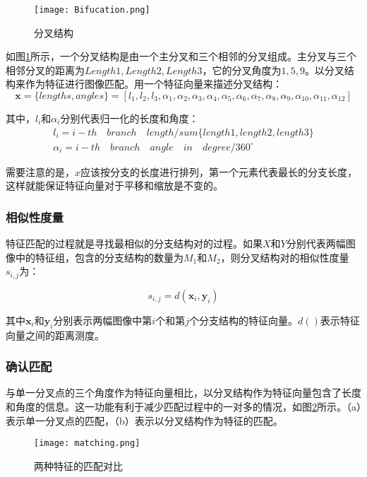 \documentclass[a4paper,12pt]{article}
\begin{document}
\begin{figure}[!htb] %
\centering
\texttt{[image: Bifucation.png]}
\caption{分叉结构}
\label{fig:1}
\end{figure}

如图\ref{fig:1}所示，一个分叉结构是由一个主分叉和三个相邻的分叉组成。主分叉与三个相邻分叉的距离为$Length1,Length2,Length3$，它的分叉角度为$1,5,9$。以分叉结构来作为特征进行图像匹配。用一个特征向量来描述分叉结构：
\begin{equation} 
\label{eq:3}
\boldsymbol{x}=\{lengths,angles\}=[l_1,l_2,l_3,\alpha_1,\alpha_2,\alpha_3,\alpha_4,\alpha_5,\alpha_6,\alpha_7,\alpha_8,\alpha_9,\alpha_{10},\alpha_{11},\alpha_{12}]
\end{equation}

其中，$l_i$和$\alpha_i$分别代表归一化的长度和角度：
\begin{equation} 
\label{eq:4}
\begin{array}{l}
l_i=i-th\quad branch\quad length/sum\{length 1,length 2,length 3\}\\
\alpha_i=i-th\quad branch\quad angle\quad in\quad degree/360^{\circ}
\end{array}
\end{equation}

需要注意的是，$x$应该按分支的长度进行排列，第一个元素代表最长的分支长度，这样就能保证特征向量对于平移和缩放是不变的。

\subsubsection{相似性度量}

特征匹配的过程就是寻找最相似的分支结构对的过程。如果$X$和$Y$分别代表两幅图像中的特征组，包含的分支结构的数量为$M_1$和$M_2$，则分叉结构对的相似性度量$s_{i,j}$为：

\begin{equation} 
\label{eq:5}
s_{i,j}=d(\boldsymbol{x}_i,\boldsymbol{y}_i)
\end{equation}

其中$\boldsymbol{x}_i$和$\boldsymbol{y}_i$分别表示两幅图像中第$i$个和第$j$个分支结构的特征向量。$d()$表示特征向量之间的距离测度。

\subsubsection{确认匹配}

与单一分叉点的三个角度作为特征向量相比，以分叉结构作为特征向量包含了长度和角度的信息。这一功能有利于减少匹配过程中的一对多的情况，如图\ref{fig:2}所示。（a）表示单一分叉点的匹配，（b）表示以分叉结构作为特征的匹配。
\begin{figure}[!htb] %
\centering
\texttt{[image: matching.png]}
\caption{两种特征的匹配对比}
\label{fig:2}
\end{figure}
\end{document}
